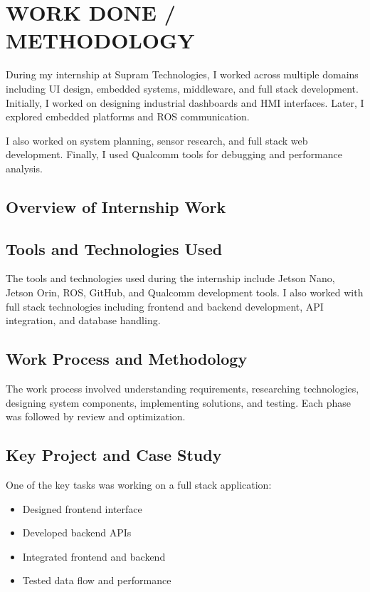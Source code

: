 \documentclass[12pt,a4paper]{report}
\begin{document}
\chapter{WORK DONE / METHODOLOGY}


During my internship at Supram Technologies, I worked across multiple domains including UI design, embedded systems, middleware, and full stack development. Initially, I worked on designing industrial dashboards and HMI interfaces. Later, I explored embedded platforms and ROS communication.


I also worked on system planning, sensor research, and full stack web development. Finally, I used Qualcomm tools for debugging and performance analysis.


\section{Overview of Internship Work}


\section{Tools and Technologies Used}

The tools and technologies used during the internship include Jetson Nano, Jetson Orin, ROS, GitHub, and Qualcomm development tools. I also worked with full stack technologies including frontend and backend development, API integration, and database handling.




\section{Work Process and Methodology}

The work process involved understanding requirements, researching technologies, designing system components, implementing solutions, and testing. Each phase was followed by review and optimization.


\section{Key Project and Case Study}

One of the key tasks was working on a full stack application:

\begin{itemize}[leftmargin=1.5em]
    \item Designed frontend interface
    \item Developed backend APIs
    \item Integrated frontend and backend
    \item Tested data flow and performance
\end{itemize}
\end{document}
